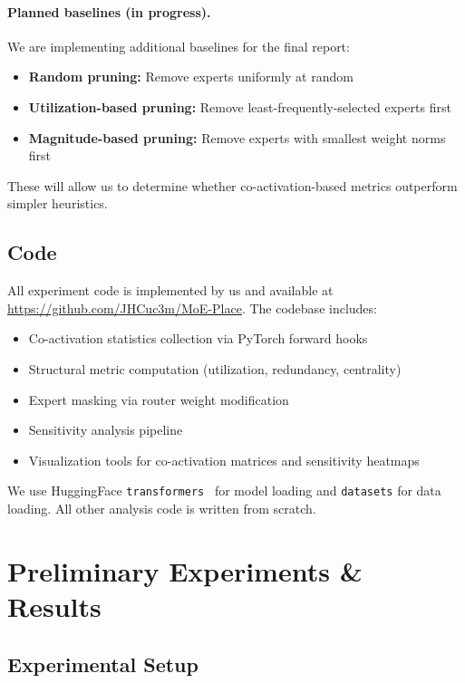 \documentclass{article}
\begin{document}
\paragraph{Planned baselines (in progress).}
We are implementing additional baselines for the final report:
\begin{itemize}
    \item \textbf{Random pruning:} Remove experts uniformly at random
    \item \textbf{Utilization-based pruning:} Remove least-frequently-selected experts first
    \item \textbf{Magnitude-based pruning:} Remove experts with smallest weight norms first
\end{itemize}
These will allow us to determine whether co-activation-based metrics outperform
simpler heuristics.

\subsection{Code}

All experiment code is implemented by us and available at
\url{https://github.com/JHCuc3m/MoE-Place}.
The codebase includes:
\begin{itemize}
    \item Co-activation statistics collection via PyTorch forward hooks
    \item Structural metric computation (utilization, redundancy, centrality)
    \item Expert masking via router weight modification
    \item Sensitivity analysis pipeline
    \item Visualization tools for co-activation matrices and sensitivity heatmaps
\end{itemize}
We use HuggingFace \texttt{transformers}~\citep{wolf2020huggingface} for model loading
and \texttt{datasets} for data loading.
All other analysis code is written from scratch.

\section{Preliminary Experiments \& Results}

\subsection{Experimental Setup}
\end{document}
